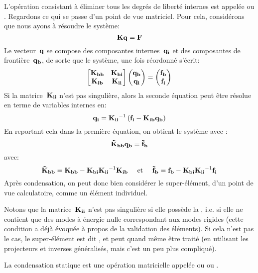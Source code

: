 L'opération consistant à éliminer tous les degrés de liberté internes est appelée  ou .
\medskipvm
Regardons ce qui se passe d'un point de vue matriciel.
Pour cela, considérons que nous ayons à résoudre le système:
\begin{equation} \MM{K} \VV{q}=\VV{F}\end{equation}
Le vecteur~$\VV{q}$ se compose des composantes internes~$\VV{q_i}$ et des composantes
de frontière~$\VV{q_b}$, de sorte que le système, une fois réordonné s'écrit:
\begin{equation}
\MM*{\MM{K_{bb}} & \MM{K_{bi}}\\
\MM{K_{ib}} & \MM{K_{ii}}}
\VV*{\VV{q_b}\\\VV{q_i}}
=
\VV*{\VV{f_b}\\\VV{f_i}}
\end{equation}
Si la matrice~$\MM{K_{ii}}$ n'est pas singulière, alors la seconde équation peut être résolue en terme de variables internes en:
\begin{equation}
\VV{q_i} = \MMI{K_{ii}}\left(\VV{f_i}-\MM{K_{ib}}\VV{q_b}\right)
\end{equation}
En reportant cela dans la première équation, on obtient le système avec :
\begin{equation}
\MM{\tilde{K}_{bb}}\VV{q_b} = \VV{\tilde{f}_b}
\end{equation}
avec:
\begin{equation}
\MM{\tilde{K}_{bb}}=\MM{K_{bb}} - \MM{K_{bi}}\MMI{K_{ii}}\MM{K_{ib}}
\quad \text{ et }\quad
\VV{\tilde{f}_b}=\VV{f_b} - \MM{K_{bi}}\MMI{K_{ii}}\VV{f_i}
\end{equation}
Après condensation, on peut donc bien considérer le super-élément, d'un point de vue calculatoire, comme un élément individuel.

\medskip
Notons que la matrice~$\MM{K_{ii}}$ n'est pas singulière si elle possède la , i.e. si elle ne contient que des modes à énergie nulle correspondant aux modes rigides (cette condition a déjà évoquée à propos de la validation des éléments). Si cela n'est pas le cas, le super-élément est dit , et peut quand même être traité (en utilisant les projecteurs et inverses généralisés, mais c'est un peu plus compliqué).

La condensation statique est une opération matricielle appelée  ou  ou .


